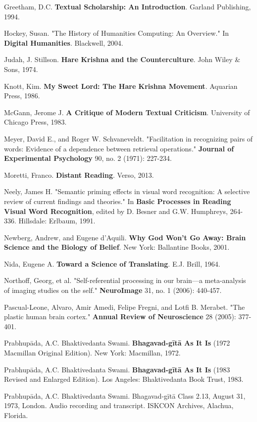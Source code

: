 \documentclass[11pt,twoside]{book}
\begin{document}
Greetham, D.C. \textbf{Textual Scholarship: An Introduction}. Garland Publishing, 1994.

Hockey, Susan. "The History of Humanities Computing: An Overview." In \textbf{Digital Humanities}. Blackwell, 2004.

Judah, J. Stillson. \textbf{Hare Krishna and the Counterculture}. John Wiley \& Sons, 1974.

Knott, Kim. \textbf{My Sweet Lord: The Hare Krishna Movement}. Aquarian Press, 1986.

McGann, Jerome J. \textbf{A Critique of Modern Textual Criticism}. University of Chicago Press, 1983.

Meyer, David E., and Roger W. Schvaneveldt. "Facilitation in recognizing pairs of words: Evidence of a dependence between retrieval operations." \textbf{Journal of Experimental Psychology} 90, no. 2 (1971): 227-234.

Moretti, Franco. \textbf{Distant Reading}. Verso, 2013.

Neely, James H. "Semantic priming effects in visual word recognition: A selective review of current findings and theories." In \textbf{Basic Processes in Reading Visual Word Recognition}, edited by D. Besner and G.W. Humphreys, 264-336. Hillsdale: Erlbaum, 1991.

Newberg, Andrew, and Eugene d'Aquili. \textbf{Why God Won't Go Away: Brain Science and the Biology of Belief}. New York: Ballantine Books, 2001.

Nida, Eugene A. \textbf{Toward a Science of Translating}. E.J. Brill, 1964.

Northoff, Georg, et al. "Self-referential processing in our brain—a meta-analysis of imaging studies on the self." \textbf{NeuroImage} 31, no. 1 (2006): 440-457.

Pascual-Leone, Alvaro, Amir Amedi, Felipe Fregni, and Lotfi B. Merabet. "The plastic human brain cortex." \textbf{Annual Review of Neuroscience} 28 (2005): 377-401.

Prabhupāda, A.C. Bhaktivedanta Swami. \textbf{Bhagavad-gītā As It Is} (1972 Macmillan Original Edition). New York: Macmillan, 1972.

Prabhupāda, A.C. Bhaktivedanta Swami. \textbf{Bhagavad-gītā As It Is} (1983 Revised and Enlarged Edition). Los Angeles: Bhaktivedanta Book Trust, 1983.

Prabhupāda, A.C. Bhaktivedanta Swami. Bhagavad-gītā Class 2.13, August 31, 1973, London. Audio recording and transcript. ISKCON Archives, Alachua, Florida.
\end{document}
